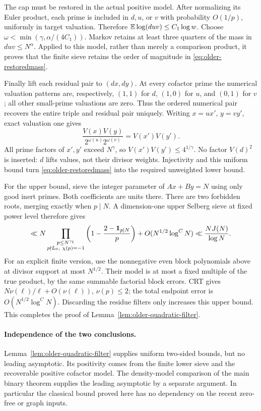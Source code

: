 The cap must be restored in the actual positive model.
After normalizing its Euler product, each prime is included in
\(d,u\), or \(v\) with probability \(O(1/p)\), uniformly in target
valuation.  Therefore
\(\mathbb E\log(duv)\le C_1\log w\).
Choose \(\omega<\min(\gamma,\alpha/(4C_1))\).
Markov retains at least three quarters of the mass in
\(duv\le N^\alpha\).  Applied to this model, rather than merely a
comparison product, it proves that the finite sieve retains the
order of magnitude in \eqref{eq:older-restoredmass}.

Finally lift each residual pair to \((dx,dy)\).
At every cofactor prime the numerical valuation patterns are,
respectively,
\((1,1)\) for \(d\), \((1,0)\) for \(u\), and \((0,1)\) for \(v\);
all other small-prime valuations are zero.
Thus the ordered numerical pair recovers the entire triple and
residual pair uniquely.
Writing \(x=ux'\), \(y=vy'\), exact valuation one gives
\[
       \frac{V(x)V(y)}{2^{\omega(u)}2^{\omega(v)}}
                                      =V(x')V(y').
\]
All prime factors of \(x',y'\) exceed \(N^\gamma\), so
\(V(x')V(y')\le4^{1/\gamma}\).
No factor \(V(d)^2\) is inserted: \(d\) lifts values, not their
divisor weights.
Injectivity and this uniform bound turn
\eqref{eq:older-restoredmass} into the required unweighted lower bound.

For the upper bound, sieve the integer parameter of \(Ax+By=N\)
using only good inert primes.  Both coefficients are units there.
There are two forbidden roots, merging exactly when \(p\mid N\).
A dimension-one upper Selberg sieve at fixed power level therefore
gives
\[
 \ll N\prod_{\substack{p\le N^{\gamma_1}\\
                       p\nmid L_0,\ \chi(p)=-1}}
       \left(1-\frac{2-\mathbf 1_{p\mid N}}p\right)
            +O(N^{1/2}\log^C N)
 \ll \frac{NJ(N)}{\log N}.
\]
For an explicit finite version, use the nonnegative even block
polynomials above at divisor support at most \(N^{1/2}\).
Their model is at most a fixed multiple of the true product,
by the same summable factorial block errors.
CRT gives \(N\nu(\ell)/\ell+O(\nu(\ell))\), \(\nu(p)\le2\);
the total endpoint error is
\(O(N^{1/2}\log^C N)\).
Discarding the residue filters only increases this upper bound.
This completes the proof of Lemma~\ref{lem:older-quadratic-filter}.

\paragraph{Independence of the two conclusions.}
Lemma~\ref{lem:older-quadratic-filter} supplies uniform two-sided
bounds, but no leading asymptotic.  Its positivity comes from the
finite lower sieve and the recoverable positive cofactor model.
The density-model comparison of the main binary theorem supplies
the leading asymptotic by a separate argument.  In particular the
classical bound proved here has no dependency on the recent
zero-free or graph inputs.
